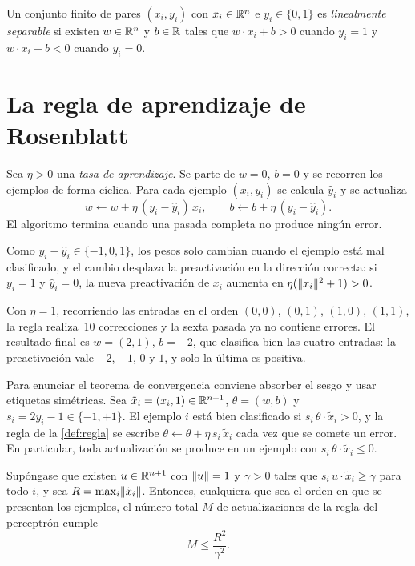 \begin{definicion}
Un conjunto finito de pares $(x_i,y_i)$ con $x_i\in\mathbb{R}^{n}$ e $y_i\in\{0,1\}$ es \emph{linealmente separable} si existen $w\in\mathbb{R}^{n}$ y $b\in\mathbb{R}$ tales que $w\cdot x_i+b>0$ cuando $y_i=1$ y $w\cdot x_i+b<0$ cuando $y_i=0$.
\end{definicion}

\section{La regla de aprendizaje de Rosenblatt}

\begin{definicion}\label{def:regla}
Sea $\eta>0$ una \emph{tasa de aprendizaje}. Se parte de $w=0$, $b=0$ y se recorren los ejemplos de forma cíclica. Para cada ejemplo $(x_i,y_i)$ se calcula $\hat y_i$ y se actualiza
\[
w\leftarrow w+\eta\,(y_i-\hat y_i)\,x_i,\qquad b\leftarrow b+\eta\,(y_i-\hat y_i).
\]
El algoritmo termina cuando una pasada completa no produce ningún error.
\end{definicion}

Como $y_i-\hat y_i\in\{-1,0,1\}$, los pesos solo cambian cuando el ejemplo está mal clasificado, y el cambio desplaza la preactivación en la dirección correcta: si $y_i=1$ y $\hat y_i=0$, la nueva preactivación de $x_i$ aumenta en $\eta(\lVert x_i\rVert^{2}+1)>0$.

\begin{ejemplo}\label{ej:rosenblatt}
Con $\eta=1$, recorriendo las entradas en el orden $(0,0)$, $(0,1)$, $(1,0)$, $(1,1)$, la regla realiza~10 correcciones y la sexta pasada ya no contiene errores. El resultado final es $w=(2,1)$, $b=-2$, que clasifica bien las cuatro entradas: la preactivación vale $-2$, $-1$, $0$ y $1$, y solo la última es positiva.
\end{ejemplo}

Para enunciar el teorema de convergencia conviene absorber el sesgo y usar etiquetas simétricas. Sea $\tilde x_i=(x_i,1)\in\mathbb{R}^{n+1}$, $\theta=(w,b)$ y $s_i=2y_i-1\in\{-1,+1\}$. El ejemplo $i$ está bien clasificado si $s_i\,\theta\cdot\tilde x_i>0$, y la regla de la \cref{def:regla} se escribe $\theta\leftarrow\theta+\eta\,s_i\,\tilde x_i$ cada vez que se comete un error. En particular, toda actualización se produce en un ejemplo con $s_i\,\theta\cdot\tilde x_i\le 0$.

\begin{teorema}\label{teo:novikoff}
Supóngase que existen $u\in\mathbb{R}^{n+1}$ con $\lVert u\rVert=1$ y $\gamma>0$ tales que $s_i\,u\cdot\tilde x_i\ge\gamma$ para todo $i$, y sea $R=\max_i\lVert\tilde x_i\rVert$. Entonces, cualquiera que sea el orden en que se presentan los ejemplos, el número total $M$ de actualizaciones de la regla del perceptrón cumple
\[
M\le\frac{R^{2}}{\gamma^{2}}.
\]
\end{teorema}


